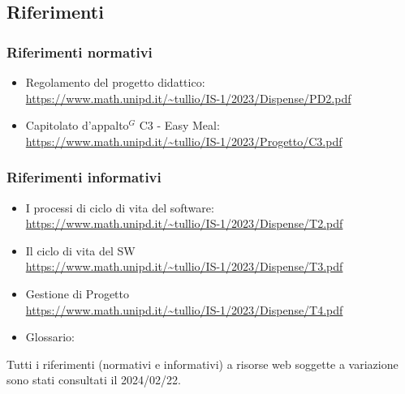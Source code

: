 \subsection{Riferimenti}
\subsubsection{Riferimenti normativi}

        \begin{itemize}
            \item Regolamento del progetto didattico: \\
            \url{https://www.math.unipd.it/~tullio/IS-1/2023/Dispense/PD2.pdf}
            \item Capitolato d’appalto$^{G}$ C3 - Easy Meal: \\
            \url{https://www.math.unipd.it/~tullio/IS-1/2023/Progetto/C3.pdf}
        \end{itemize}
        
        \subsubsection{Riferimenti informativi}

        \begin{itemize}
            \item I processi di ciclo di vita del software: \\
            \url{https://www.math.unipd.it/~tullio/IS-1/2023/Dispense/T2.pdf}
            \item Il ciclo di vita del SW\\
            \url{https://www.math.unipd.it/~tullio/IS-1/2023/Dispense/T3.pdf}
            \item Gestione di Progetto\\
            \url{https://www.math.unipd.it/~tullio/IS-1/2023/Dispense/T4.pdf}
            \item Glossario: \\
            \url{} %
        \end{itemize}

        Tutti i riferimenti (normativi e informativi) a risorse web soggette a variazione sono stati consultati il 2024/02/22.

